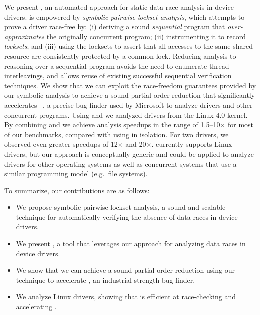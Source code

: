 We present \whoop, an automated approach for static data race analysis in device drivers. \whoop is empowered by \emph{symbolic pairwise lockset analysis}, which attempts to prove a driver race-free by: (i) deriving a sound \emph{sequential} program that \emph{over-approximates} the originally concurrent program; (ii) instrumenting it to record \emph{locksets}; and (iii) using the locksets to assert that all accesses to the same shared resource are consistently protected by a common lock. Reducing analysis to reasoning over a sequential program avoids the need to enumerate thread interleavings, and allows reuse of existing successful sequential verification techniques.
%
We show that we can exploit the race-freedom guarantees provided by our symbolic analysis to achieve a sound partial-order reduction that significantly accelerates \corral~\cite{lal2012corral}, a precise bug-finder used by Microsoft to analyze drivers and other concurrent programs. Using \whoop and \corral we analyzed \sizeOfBenchmarks drivers from the Linux 4.0 kernel.  By combining \whoop and \corral we achieve analysis speedups in the range of 1.5--10$\times$ for most of our benchmarks, compared with using \corral in isolation.  For two drivers, we observed even greater speedups of 12$\times$ and 20$\times$.
%
\whoop currently supports Linux drivers, but our approach is conceptually generic and could be applied to analyze drivers for other operating systems as well as concurrent systems that use a similar programming model (e.g.\ file systems).

To summarize, our contributions are as follows:
\vspace{-0.5mm}
\begin{itemize}
\item We propose symbolic pairwise lockset analysis, a sound and scalable technique for automatically verifying the absence of data races in device drivers.
\vspace{-0.2mm}
\item We present \whoop, a tool that leverages our approach for analyzing data races in device drivers.
\vspace{-0.2mm}
\item We show that we can achieve a sound partial-order reduction using our technique to accelerate \corral, an industrial-strength bug-finder.
\vspace{-0.2mm}
\item We analyze \sizeOfBenchmarks Linux drivers, showing that \whoop is efficient at race-checking and accelerating \corral.
\end{itemize}
